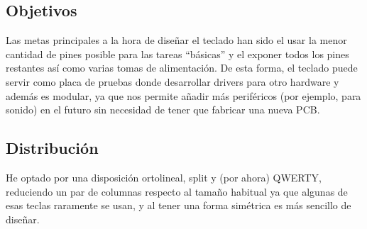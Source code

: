\subsection{Objetivos}
Las metas principales a la hora de diseñar el teclado han sido el usar la menor cantidad de pines posible para las tareas ``básicas'' y el exponer todos los pines restantes así como varias tomas de alimentación. \newline
De esta forma, el teclado puede servir como placa de pruebas donde desarrollar drivers para otro hardware y además es modular, ya que nos permite añadir más periféricos (por ejemplo, para sonido) en el futuro sin necesidad de tener que fabricar una nueva PCB.

\subsection{Distribución}
He optado por una disposición ortolineal, split y (por ahora) QWERTY, reduciendo un par de columnas respecto al tamaño habitual ya que algunas de esas teclas raramente se usan, y al tener una forma simétrica es más sencillo de diseñar. 

